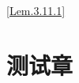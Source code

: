 \documentclass[color=green]{textbook-cn}%
\newlength{\la}\newlength{\lb}\newlength{\lc}\newlength{\ld}
\begin{document}
\begin{Lemma}[定义名称]
	\lipsum[2]
\end{Lemma}

\begin{Lemma}[定义名称]
	\lipsum[2]
\end{Lemma}

\ref{Lem.3.11.1}
\pageref{Lem.3.11.2}

\begin{Proposition}[定义名称]
	\lipsum[2]
\end{Proposition}


\begin{Corollary}[定义名称]
	\lipsum[2]
\end{Corollary}


\begin{Definition}[定义名称]
	\lipsum[2]
\end{Definition}


\chapter{测试章}
\lipsum
\end{document}
